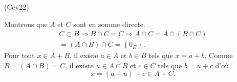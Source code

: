 \begin{tiny}(Cev22)\end{tiny}
Montrons que $A$ et $C$ sont en somme directe.
\begin{multline*}
 C \subset B \Rightarrow B \cap C = C \Rightarrow A \cap C = A \cap (B \cap C )\\
 = (A \cap B) \cap C = \left\lbrace 0_E \right\rbrace .
\end{multline*}
Pour tout $x\in A + B$, il existe $a\in A$ et $b \in B$ tels que $x = a + b$. Comme $B = (A\cap B) = C$,
il existe $u \in A\cap B$ et $c\in C$ tels que $b = u+c$ d'où
\[
 x = (a + u) + c \in A + C.
\]
